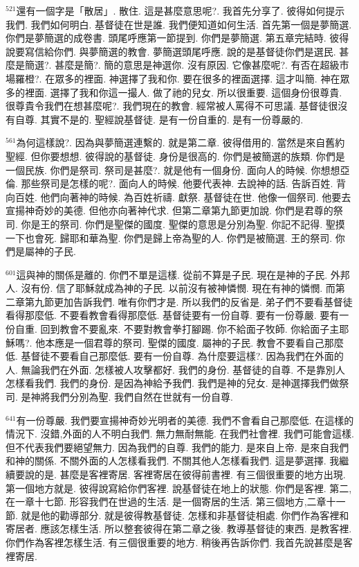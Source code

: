 \documentclass{book}
\begin{document}
$^{521}$還有一個字是「散居」.
散住.
這是甚麼意思呢?.
我首先分享了.
彼得如何提示我們.
我們如何明白.
基督徒在世是誰.
我們便知道如何生活.
首先第一個是夢簡選.
你們是夢簡選的成卷書.
頭尾呼應第一節提到.
你們是夢簡選.
第五章完結時.
彼得說要寫信給你們.
與夢簡選的教會.
夢簡選頭尾呼應.
說的是基督徒你們是選民.
甚麼是簡選?.
甚麼是簡?.
簡的意思是神選你.
沒有原因.
它像甚麼呢?.
有否在超級市場羅橙?.
在眾多的裡面.
神選擇了我和你.
要在很多的裡面選擇.
這才叫簡.
神在眾多的裡面.
選擇了我和你這一撮人.
做了祂的兒女.
所以很重要.
這個身份很尊貴.
很尊貴令我們在想甚麼呢?.
我們現在的教會.
經常被人罵得不可思議.
基督徒很沒有自尊.
其實不是的.
聖經說基督徒.
是有一份自重的.
是有一份尊嚴的.

$^{561}$為何這樣說?.
因為與夢簡選連繫的.
就是第二章.
彼得借用的.
當然是來自舊約聖經.
但你要想想.
彼得說的基督徒.
身份是很高的.
你們是被簡選的族類.
你們是一個民族.
你們是祭司.
祭司是甚麼?.
就是他有一個身份.
面向人的時候.
你想想亞倫.
那些祭司是怎樣的呢?.
面向人的時候.
他要代表神.
去說神的話.
告訴百姓.
背向百姓.
他們向著神的時候.
為百姓祈禱.
獻祭.
基督徒在世.
他像一個祭司.
他要去宣揚神奇妙的美德.
但他亦向著神代求.
但第二章第九節更加說.
你們是君尊的祭司.
你是王的祭司.
你們是聖傑的國度.
聖傑的意思是分別為聖.
你記不記得.
聖摸一下也會死.
歸耶和華為聖.
你們是歸上帝為聖的人.
你們是被簡選.
王的祭司.
你們是屬神的子民.

$^{601}$這與神的關係是離的.
你們不單是這樣.
從前不算是子民.
現在是神的子民.
外邦人.
沒有份.
信了耶穌就成為神的子民.
以前沒有被神憐憫.
現在有神的憐憫.
而第二章第九節更加告訴我們.
唯有你們才是.
所以我們的反省是.
弟子們不要看基督徒看得那麼低.
不要看教會看得那麼低.
基督徒要有一份自尊.
要有一份尊嚴.
要有一份自重.
回到教會不要亂來.
不要對教會拳打腳踢.
你不給面子牧師.
你給面子主耶穌嗎?.
他本應是一個君尊的祭司.
聖傑的國度.
屬神的子民.
教會不要看自己那麼低.
基督徒不要看自己那麼低.
要有一份自尊.
為什麼要這樣?.
因為我們在外面的人.
無論我們在外面.
怎樣被人攻擊都好.
我們的身份.
基督徒的自尊.
不是靠別人怎樣看我們.
我們的身份.
是因為神給予我們.
我們是神的兒女.
是神選擇我們做祭司.
是神將我們分別為聖.
我們自然在世就有一份自尊.

$^{641}$有一份尊嚴.
我們要宣揚神奇妙光明者的美德.
我們不會看自己那麼低.
在這樣的情況下.
沒錯,外面的人不明白我們.
無力無耐無能.
在我們社會裡.
我們可能會這樣.
但不代表我們要絕望無力.
因為我們的自尊.
我們的能力.
是來自上帝.
是來自我們和神的關係.
不關外面的人怎樣看我們.
不關其他人怎樣看我們.
這是夢選擇.
我繼續要說的是.
甚麼是客裡寄居.
客裡寄居在彼得前書裡.
有三個很重要的地方出現.
第一個地方就是.
彼得說寫給你們客裡.
說基督徒在地上的狀態.
你們是客裡.
第二,在一章十七節.
形容我們在世過的生活.
是一個寄居的生活.
第三個地方,二章十一節.
就是他的勸導部分.
就是彼得教基督徒.
怎樣和非基督徒相處.
你們作為客裡和寄居者.
應該怎樣生活.
所以整套彼得在第二章之後.
教導基督徒的東西.
是教客裡.
你們作為客裡怎樣生活.
有三個很重要的地方.
稍後再告訴你們.
我首先說甚麼是客裡寄居.
\end{document}
